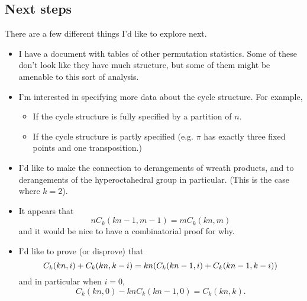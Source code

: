 \documentclass{article}
\let\originalleft\left
\let\originalright\right
\renewcommand{\left}{\mathopen{}\mathclose\bgroup\originalleft}
\renewcommand{\right}{\aftergroup\egroup\originalright}
\numberwithin{equation}{subsection}
\begin{document}
\subsection{Next steps}
There are a few different things I'd like to explore next. \begin{itemize}
  \item I have a document with tables of other permutation statistics.
    Some of these don't look like they have much structure, but some of them
    might be amenable to this sort of analysis.
  \item I'm interested in specifying more data about the cycle structure. For example,
    \begin{itemize}
      \item If the cycle structure is fully specified by a partition of $n$.
      \item If the cycle structure is partly specified (e.g. $\pi$ has exactly three fixed points and one transposition.)
    \end{itemize}
  \item I'd like to make the connection to derangements of wreath products, and
  to derangements of the hyperoctahedral group in particular.
  (This is the case where $k = 2$).
  \item It appears that \begin{equation}
      nC_k(kn-1, m-1) = mC_k(kn, m)
    \end{equation} and it would be nice to have a combinatorial proof for why.
  \item I'd like to prove (or disprove) that \begin{equation}
      C_k(kn, i) + C_k(kn, k-i) = kn\left(C_k(kn-1, i) + C_k(kn-1, k-i)\right)
    \end{equation} and in particular when $i = 0$, \begin{equation}
      C_k(kn, 0) - knC_k(kn-1, 0) = C_k(kn, k).
    \end{equation}
\end{itemize}
\pagebreak
\end{document}

